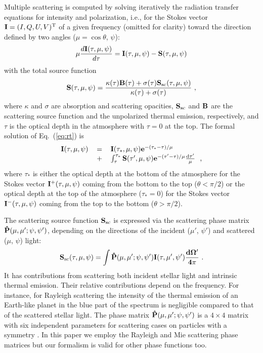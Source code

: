 \documentclass{emulateapj}
\begin{document}
Multiple scattering is computed by solving iteratively 
the radiation transfer equations for intensity and polarization, i.e., for 
the Stokes vector ${\bf I}=(I,Q,U,V)^\mathrm{T}$ 
of a given frequency (omitted for clarity) toward the direction defined by two angles 
($\mu=\cos\theta$, $\psi$):
%
\begin{equation}\label{eq:rt}
\mu\frac{d\bf{I}(\tau,\mu,\psi)}{d\tau} = \bf{I}(\tau,\mu,\psi) - \bf{S}(\tau,\mu,\psi)
\end{equation}
%
with the total source function
%
\begin{equation}\label{eq:sourcef}
\bf{S}(\tau,\mu,\psi) = \frac{\kappa(\tau)\bf{B}(\tau)+\sigma(\tau)\bf{S}_\mathrm{sc}(\tau,\mu,\psi)}{\kappa(\tau)+\sigma(\tau)}
\rm \ ,
\end{equation}
%
where $\kappa$ and $\sigma$ are absorption and scattering opacities, 
$\bf{S}_\mathrm{sc}$ and $\bf{B}$  are the scattering source function and 
the unpolarized thermal emission, respectively, and $\tau$ is the optical depth in the atmosphere
with $\tau=0$ at the top. The formal solution of Eq.~(\ref{eq:rt}) is \citep[e.g.,][]{Sobolev1956}
%
\begin{equation}\label{eq:rt_formal}
\begin{tabular}{rcl}
$\bf{I}(\tau,\mu,\psi)$ & $=$ & $\bf{I}(\tau_*,\mu,\psi)e^{-(\tau_*-\tau)/\mu}$ \\
                 & $+$ & $\int_{\tau}^{\tau_*} \bf{S}(\tau',\mu,\psi)e^{-(\tau'-\tau)/\mu}\frac{\mathrm{d}\tau'}{\mu}$ 
				 \rm \ ,
\end{tabular}
\end{equation}
%
where $\tau_*$ is either the optical depth at the bottom of the atmosphere for the Stokes vector 
$\bf{I}^+(\tau,\mu,\psi)$ coming from the bottom to the top ($\theta < \pi/2$) or the optical depth 
at the top of the atmosphere ($\tau_*=0$) for the Stokes vector $\bf{I}^-(\tau,\mu,\psi)$ coming from 
the top to the bottom ($\theta > \pi/2$).

The scattering source function $\bf{S}_\mathrm{sc}$ is expressed via the scattering phase matrix 
$\bf{\hat{P}}(\mu,\mu';\psi,\psi')$, depending on the directions of the incident ($\mu'$, $\psi'$) 
and scattered ($\mu$, $\psi$) light:
\begin{equation}\label{eq:sourcef_sc}
\bf{S}_\mathrm{sc}(\tau,\mu,\psi) = \int \bf{\hat{P}}(\mu,\mu';\psi,\psi')\bf{I}(\tau,\mu',\psi')\frac{d\Omega'}{4\pi}
\rm \ .
\end{equation}
It has contributions from scattering both incident stellar light and intrinsic thermal emission. 
Their relative contributions depend on the frequency. For instance, for Rayleigh scattering 
the intensity of the thermal emission of an Earth-like planet in the blue part of the spectrum 
is negligible compared to that of the scattered stellar light. The phase matrix 
$\bf{\hat{P}}(\mu,\mu';\psi,\psi')$ is a $4\times4$ matrix with six independent parameters 
for scattering cases 
on particles with a symmetry \citep[e.g.,][]{HansenTravis1974}. In this paper we employ the Rayleigh 
and Mie scattering phase matrices but our formalism is valid for other phase functions too.
\end{document}
